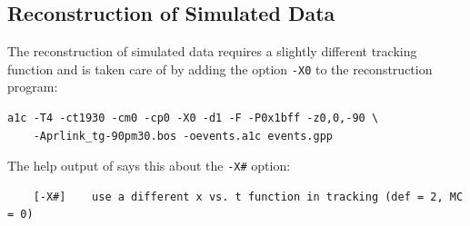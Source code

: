 \subsection{\label{sec:sim.recon}Reconstruction of Simulated Data}

The reconstruction of simulated data requires a slightly different tracking function and is taken care of by adding the option \verb+-X0+ to the reconstruction program:
\begin{verbatim}
a1c -T4 -ct1930 -cm0 -cp0 -X0 -d1 -F -P0x1bff -z0,0,-90 \
    -Aprlink_tg-90pm30.bos -oevents.a1c events.gpp
\end{verbatim}
The help output of  says this about the \verb+-X#+ option:
\begin{verbatim}
    [-X#]    use a different x vs. t function in tracking (def = 2, MC = 0)
\end{verbatim}

\FloatBarrier


